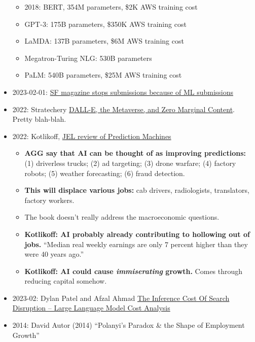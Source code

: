 \documentclass[
  11pt,
  letterpaper,
  DIV=11,
  numbers=noendperiod,
  oneside]{scrartcl}
\providecommand{\tightlist}{%
  \setlength{\itemsep}{0pt}\setlength{\parskip}{0pt}}\usepackage{longtable,booktabs,array}
\begin{document}
\begin{itemize}
  \begin{itemize}
  \tightlist
  \item
    2018: BERT, 354M parameters, \$2K AWS training cost
  \item
    GPT-3: 175B parameters, \$350K AWS training cost
  \item
    LaMDA: 137B parameters, \$6M AWS training cost
  \item
    Megatron-Turing NLG: 530B parameters
  \item
    PaLM: 540B parameters, \$25M AWS training cost
  \end{itemize}
\item
  2023-02-01:
  \href{https://www.pcgamer.com/major-sci-fi-magazine-halts-submissions-due-to-flood-of-stories-written-by-ai-chatbots/}{SF
  magazine stops submissions because of ML submissions}
\item
  2022: Stratechery
  \href{https://stratechery.com/2022/dall-e-the-metaverse-and-zero-marginal-content/}{DALL-E,
  the Metaverse, and Zero Marginal Content}. Pretty blah-blah.
\item
  2022: Kotlikoff,
  \href{https://pubs.aeaweb.org/doi/pdfplus/10.1257/jel.20191519}{JEL
  review of Prediction Machines}

  \begin{itemize}
  \tightlist
  \item
    \textbf{AGG say that AI can be thought of as improving predictions:}
    (1) driverless trucks; (2) ad targeting; (3) drone warfare; (4)
    factory robots; (5) weather forecasting; (6) fraud detection.
  \item
    \textbf{This will displace various jobs:} cab drivers, radiologists,
    translators, factory workers.
  \item
    The book doesn't really address the macroeconomic questions.
  \item
    \textbf{Kotlikoff: AI probably already contributing to hollowing out
    of jobs.} ``Median real weekly earnings are only 7 percent higher
    than they were 40 years ago.''
  \item
    \textbf{Kotlikoff: AI could cause \emph{immiserating} growth.} Comes
    through reducing capital somehow.
  \end{itemize}
\item
  2023-02: Dylan Patel and Afzal Ahmad
  \href{https://www.semianalysis.com/p/the-inference-cost-of-search-disruption}{The
  Inference Cost Of Search Disruption -- Large Language Model Cost
  Analysis}
\item
  2014: David Autor (2014) ``Polanyi's Paradox \& the Shape of
  Employment Growth''


\end{itemize}
\end{document}
